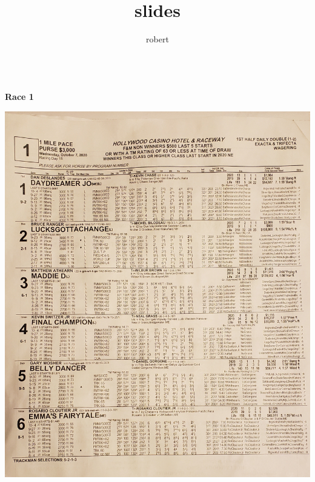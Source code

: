 \documentclass{article}
\title{slides}
\author{robert}
\begin{document}
\newpage
\begin{center}
\small{~\\}
\textbf{\LARGE{\textcolor[rgb]{0,0,0}{Race 1 }}}\\
\begin{turn}{0}
\includegraphics[scale=0.12]{race01.jpg}
\end{turn}
\end{center}
\newpage
\end{document}
